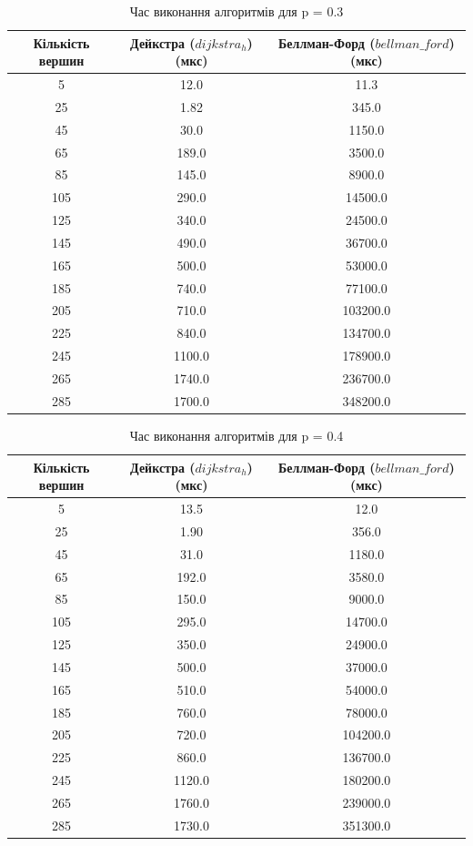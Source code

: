 \documentclass[a4paper,12pt]{article}
\begin{document}
\begin{table}[ht]
    \centering
    \caption{Час виконання алгоритмів для p = 0.3}
    \begin{tabular}{|c|c|c|}
        \hline
        Кількість вершин & Дейкстра ($dijkstra_h$) (мкс) & Беллман-Форд ($bellman\_ford$) (мкс) \\
        \hline
        5   & 12.0    & 11.3 \\
        25  & 1.82    & 345.0 \\
        45  & 30.0    & 1150.0 \\
        65  & 189.0   & 3500.0 \\
        85  & 145.0   & 8900.0 \\
        105 & 290.0   & 14500.0 \\
        125 & 340.0   & 24500.0 \\
        145 & 490.0   & 36700.0 \\
        165 & 500.0   & 53000.0 \\
        185 & 740.0   & 77100.0 \\
        205 & 710.0   & 103200.0 \\
        225 & 840.0   & 134700.0 \\
        245 & 1100.0  & 178900.0 \\
        265 & 1740.0  & 236700.0 \\
        285 & 1700.0  & 348200.0 \\
        \hline
    \end{tabular}
    \label{tab:data_0.3}
\end{table}

\begin{table}[ht]
    \centering
    \caption{Час виконання алгоритмів для p = 0.4}
    \begin{tabular}{|c|c|c|}
        \hline
        Кількість вершин & Дейкстра ($dijkstra_h$) (мкс) & Беллман-Форд ($bellman\_ford$) (мкс) \\
        \hline
        5   & 13.5    & 12.0 \\
        25  & 1.90    & 356.0 \\
        45  & 31.0    & 1180.0 \\
        65  & 192.0   & 3580.0 \\
        85  & 150.0   & 9000.0 \\
        105 & 295.0   & 14700.0 \\
        125 & 350.0   & 24900.0 \\
        145 & 500.0   & 37000.0 \\
        165 & 510.0   & 54000.0 \\
        185 & 760.0   & 78000.0 \\
        205 & 720.0   & 104200.0 \\
        225 & 860.0   & 136700.0 \\
        245 & 1120.0  & 180200.0 \\
        265 & 1760.0  & 239000.0 \\
        285 & 1730.0  & 351300.0 \\
        \hline
    \end{tabular}
    \label{tab:data_0.4}
\end{table}
\end{document}
